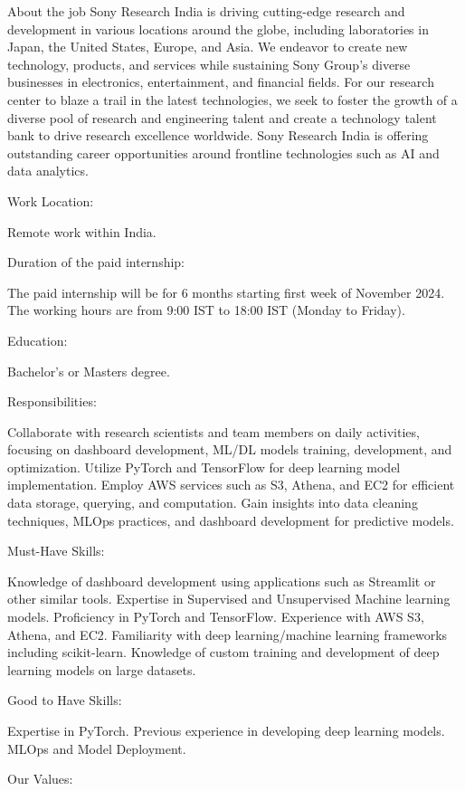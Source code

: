 About the job
Sony Research India is driving cutting-edge research and development in various locations around the globe, including laboratories in Japan, the United States, Europe, and Asia. We endeavor to create new technology, products, and services while sustaining Sony Group’s diverse businesses in electronics, entertainment, and financial fields. For our research center to blaze a trail in the latest technologies, we seek to foster the growth of a diverse pool of research and engineering talent and create a technology talent bank to drive research excellence worldwide. Sony Research India is offering outstanding career opportunities around frontline technologies such as AI and data analytics.



Work Location:

Remote work within India.


Duration of the paid internship:

The paid internship will be for 6 months starting first week of November 2024.
The working hours are from 9:00 IST to 18:00 IST (Monday to Friday).


Education:

Bachelor's or Masters degree.


Responsibilities:

Collaborate with research scientists and team members on daily activities, focusing on dashboard development, ML/DL models training, development, and optimization.
Utilize PyTorch and TensorFlow for deep learning model implementation.
Employ AWS services such as S3, Athena, and EC2 for efficient data storage, querying, and computation.
Gain insights into data cleaning techniques, MLOps practices, and dashboard development for predictive models.


Must-Have Skills:

Knowledge of dashboard development using applications such as Streamlit or other similar tools.
Expertise in Supervised and Unsupervised Machine learning models.
Proficiency in PyTorch and TensorFlow.
Experience with AWS S3, Athena, and EC2.
Familiarity with deep learning/machine learning frameworks including scikit-learn.
Knowledge of custom training and development of deep learning models on large datasets.


Good to Have Skills:

Expertise in PyTorch.
Previous experience in developing deep learning models.
MLOps and Model Deployment.


Our Values:

